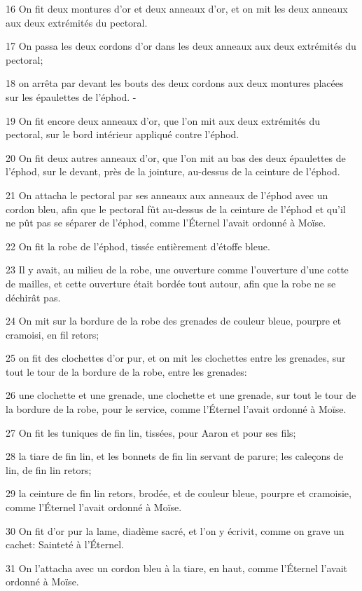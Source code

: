 \par 16 On fit deux montures d'or et deux anneaux d'or, et on mit les deux anneaux aux deux extrémités du pectoral.
\par 17 On passa les deux cordons d'or dans les deux anneaux aux deux extrémités du pectoral;
\par 18 on arrêta par devant les bouts des deux cordons aux deux montures placées sur les épaulettes de l'éphod. -
\par 19 On fit encore deux anneaux d'or, que l'on mit aux deux extrémités du pectoral, sur le bord intérieur appliqué contre l'éphod.
\par 20 On fit deux autres anneaux d'or, que l'on mit au bas des deux épaulettes de l'éphod, sur le devant, près de la jointure, au-dessus de la ceinture de l'éphod.
\par 21 On attacha le pectoral par ses anneaux aux anneaux de l'éphod avec un cordon bleu, afin que le pectoral fût au-dessus de la ceinture de l'éphod et qu'il ne pût pas se séparer de l'éphod, comme l'Éternel l'avait ordonné à Moïse.
\par 22 On fit la robe de l'éphod, tissée entièrement d'étoffe bleue.
\par 23 Il y avait, au milieu de la robe, une ouverture comme l'ouverture d'une cotte de mailles, et cette ouverture était bordée tout autour, afin que la robe ne se déchirât pas.
\par 24 On mit sur la bordure de la robe des grenades de couleur bleue, pourpre et cramoisi, en fil retors;
\par 25 on fit des clochettes d'or pur, et on mit les clochettes entre les grenades, sur tout le tour de la bordure de la robe, entre les grenades:
\par 26 une clochette et une grenade, une clochette et une grenade, sur tout le tour de la bordure de la robe, pour le service, comme l'Éternel l'avait ordonné à Moïse.
\par 27 On fit les tuniques de fin lin, tissées, pour Aaron et pour ses fils;
\par 28 la tiare de fin lin, et les bonnets de fin lin servant de parure; les caleçons de lin, de fin lin retors;
\par 29 la ceinture de fin lin retors, brodée, et de couleur bleue, pourpre et cramoisie, comme l'Éternel l'avait ordonné à Moïse.
\par 30 On fit d'or pur la lame, diadème sacré, et l'on y écrivit, comme on grave un cachet: Sainteté à l'Éternel.
\par 31 On l'attacha avec un cordon bleu à la tiare, en haut, comme l'Éternel l'avait ordonné à Moïse.
